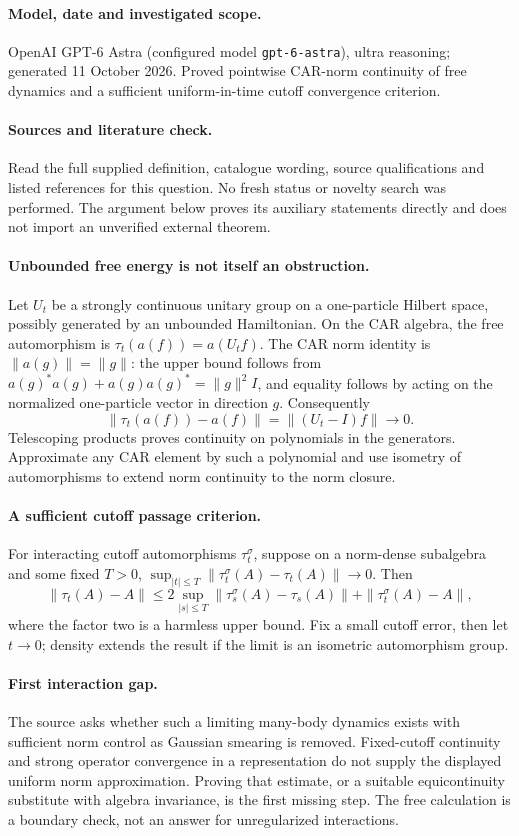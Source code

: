 \documentclass[11pt]{article}
\begin{document}
\paragraph{Model, date and investigated scope.}
OpenAI GPT-6 Astra (configured model \texttt{gpt-6-astra}), ultra reasoning; generated 11 October 2026. Proved pointwise CAR-norm continuity of free dynamics and a sufficient uniform-in-time cutoff convergence criterion.

\paragraph{Sources and literature check.}
Read the full supplied definition, catalogue wording, source qualifications and listed references for this question. No fresh status or novelty search was performed. The argument below proves its auxiliary statements directly and does not import an unverified external theorem.

\paragraph{Unbounded free energy is not itself an obstruction.} Let \(U_t\) be a strongly continuous unitary group on a one-particle Hilbert space, possibly generated by an unbounded Hamiltonian. On the CAR algebra, the free automorphism is \(\tau_t(a(f))=a(U_tf)\). The CAR norm identity is \(\|a(g)\|=\|g\|\): the upper bound follows from \(a(g)^*a(g)+a(g)a(g)^*=\|g\|^2I\), and equality follows by acting on the normalized one-particle vector in direction \(g\). Consequently
\[
 \|\tau_t(a(f))-a(f)\|=\|(U_t-I)f\|\longrightarrow0.
\]
Telescoping products proves continuity on polynomials in the generators. Approximate any CAR element by such a polynomial and use isometry of automorphisms to extend norm continuity to the norm closure.
\paragraph{A sufficient cutoff passage criterion.} For interacting cutoff automorphisms \(\tau_t^\sigma\), suppose on a norm-dense subalgebra and some fixed \(T>0\), \(\sup_{|t|\leq T}\|\tau_t^\sigma(A)-\tau_t(A)\|\to0\). Then
\[
 \|\tau_t(A)-A\|\leq
 2\sup_{|s|\leq T}\|\tau_s^\sigma(A)-\tau_s(A)\|
 +\|\tau_t^\sigma(A)-A\|,
\]
where the factor two is a harmless upper bound. Fix a small cutoff error, then let \(t\to0\); density extends the result if the limit is an isometric automorphism group.
\paragraph{First interaction gap.} The source asks whether such a limiting many-body dynamics exists with sufficient norm control as Gaussian smearing is removed. Fixed-cutoff continuity and strong operator convergence in a representation do not supply the displayed uniform norm approximation. Proving that estimate, or a suitable equicontinuity substitute with algebra invariance, is the first missing step. The free calculation is a boundary check, not an answer for unregularized interactions.
\end{document}
